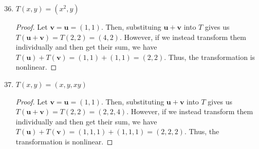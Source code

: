 \documentclass{article}
\begin{document}
\begin{enumerate}
    \setcounter{enumi}{35}
    \item \(T(x,y) = (x^2,y)\)\begin{proof}
        Let \(\mathbf{v} = \mathbf{u} = (1,1)\). Then, substituing \(\mathbf{u} + \mathbf{v}\) into \(T\) gives us \(T(\mathbf{u} + \mathbf{v}) = T(2,2) = (4,2)\). However, if 
        we instead transform them individually and then get their sum, we have \(T(\mathbf{u}) + T(\mathbf{v}) = (1,1) + (1,1) = (2,2)\). Thus, 
        the transformation is nonlinear. 
    \end{proof}
    \item \(T(x,y) = (x,y,xy)\)\begin{proof}
        Let \(\mathbf{v} = \mathbf{u} = (1,1)\). Then, substituting \(\mathbf{u} + \mathbf{v}\) into \(T\) gives us \(T(\mathbf{u} + \mathbf{v}) = T(2,2) = (2,2,4)\). However, if 
        we instead transform them individually and then get their sum, we have \(T(\mathbf{u}) + T(\mathbf{v}) = (1,1,1) + (1,1,1) = (2,2,2)\). Thus, 
        the transformation is nonlinear. 
    \end{proof}
\end{enumerate}
\pagebreak 
\end{document}
